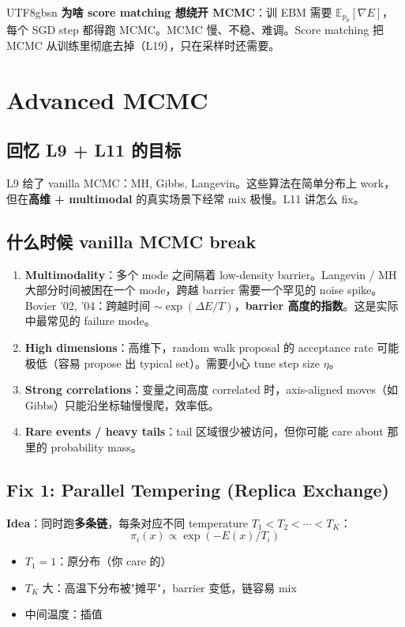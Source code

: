 \documentclass[11pt]{article}
\begin{document}
\begin{CJK}{UTF8}{gbsn}
\textbf{为啥 score matching 想绕开 MCMC}：训 EBM 需要 $\mathbb{E}_{p_\theta}[\nabla E]$，每个 SGD step 都得跑 MCMC。MCMC 慢、不稳、难调。Score matching 把 MCMC 从训练里彻底去掉（L19），只在采样时还需要。

\section{Advanced MCMC}

\subsection{回忆 L9 + L11 的目标}

L9 给了 vanilla MCMC：MH, Gibbs, Langevin。这些算法在简单分布上 work，但在\textbf{高维 + multimodal} 的真实场景下经常 mix 极慢。L11 讲怎么 fix。

\subsection{什么时候 vanilla MCMC break}

\begin{enumerate}
  \item \textbf{Multimodality}：多个 mode 之间隔着 low-density barrier。Langevin / MH 大部分时间被困在一个 mode，跨越 barrier 需要一个罕见的 noise spike。Bovier '02, '04：跨越时间 $\sim \exp(\Delta E / T)$，\textbf{barrier 高度的指数}。这是实际中最常见的 failure mode。
  \item \textbf{High dimensions}：高维下，random walk proposal 的 acceptance rate 可能极低（容易 propose 出 typical set）。需要小心 tune step size $\eta$。
  \item \textbf{Strong correlations}：变量之间高度 correlated 时，axis-aligned moves（如 Gibbs）只能沿坐标轴慢慢爬，效率低。
  \item \textbf{Rare events / heavy tails}：tail 区域很少被访问，但你可能 care about 那里的 probability mass。
\end{enumerate}

\subsection{Fix 1: Parallel Tempering (Replica Exchange)}

\textbf{Idea}：同时跑\textbf{多条链}，每条对应不同 temperature $T_1 < T_2 < \cdots < T_K$：
\[
\pi_i(x) \propto \exp(-E(x) / T_i)
\]
\begin{itemize}[nosep]
  \item $T_1 = 1$：原分布（你 care 的）
  \item $T_K$ 大：高温下分布被"摊平"，barrier 变低，链容易 mix
  \item 中间温度：插值
\end{itemize}


\end{CJK}
\end{document}
